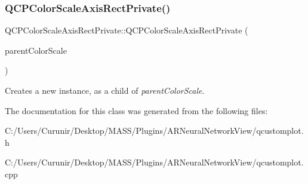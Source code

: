 \subsubsection{\texorpdfstring{Q\+C\+P\+Color\+Scale\+Axis\+Rect\+Private()}{QCPColorScaleAxisRectPrivate()}}
{\footnotesize\ttfamily Q\+C\+P\+Color\+Scale\+Axis\+Rect\+Private\+::\+Q\+C\+P\+Color\+Scale\+Axis\+Rect\+Private (\begin{DoxyParamCaption}\item[{\hyperlink{class_q_c_p_color_scale}{Q\+C\+P\+Color\+Scale} $\ast$}]{parent\+Color\+Scale }\end{DoxyParamCaption})\hspace{0.3cm}{\ttfamily [explicit]}}

Creates a new instance, as a child of {\itshape parent\+Color\+Scale}. 

The documentation for this class was generated from the following files\+:\begin{DoxyCompactItemize}
\item 
C\+:/\+Users/\+Curunir/\+Desktop/\+M\+A\+S\+S/\+Plugins/\+A\+R\+Neural\+Network\+View/qcustomplot.\+h\item 
C\+:/\+Users/\+Curunir/\+Desktop/\+M\+A\+S\+S/\+Plugins/\+A\+R\+Neural\+Network\+View/qcustomplot.\+cpp\end{DoxyCompactItemize}
